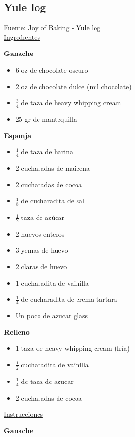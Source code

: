 \subsection{Yule log}

Fuente: \href{http://www.joyofbaking.com/YuleLog.html}{Joy of Baking - Yule log}\\

\underline{Ingredientes}

\textbf{Ganache}

\begin{itemize}
\item 6 oz de chocolate oscuro
\item 2 oz de chocolate dulce (mil chocolate)
\item $\frac{3}{4}$ de taza de heavy whipping cream
\item 25 gr de mantequilla
\end{itemize}

\textbf{Esponja}

\begin{itemize}
\item $\frac{1}{4}$ de taza de harina
\item 2 cucharadas de maicena
\item 2 cucharadas de cocoa
\item $\frac{1}{8}$ de cucharadita de sal
\item $\frac{1}{2}$ taza de az\'ucar
\item 2 huevos enteros
\item 3 yemas de huevo
\item 2 claras de huevo
\item 1 cucharadita de vainilla
\item $\frac{1}{4}$ de cucharadita de crema tartara
\item Un poco de azucar glass
\end{itemize}

\textbf{Relleno}

\begin{itemize}
\item 1 taza de heavy whipping cream (fría)
\item $\frac{1}{2}$ cucharadita de vainilla
\item $\frac{1}{4}$ de taza de azucar
\item 2 cucharadas de cocoa
\end{itemize}

\underline{Instrucciones}

\textbf{Ganache}

